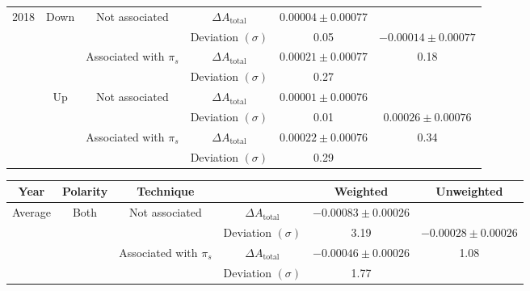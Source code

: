 \documentclass{article}
\begin{document}
\begin{center}
\begin{tabular}{c|c|c|c|c|c}
                        \multirow{8}{*}{2018} & \multirow{4}{*}{Down} & \multirow{2}{*}{Not associated} & $\Delta A_\text{total}$ & $0.00004\pm 0.00077$& \\
                        & & & Deviation $(\sigma)$ & 0.05& $-0.00014\pm 0.00077$\\
                        \cline{3-5}
                        & & \multirow{2}{*}{Associated with $\pi_s$} & $\Delta A_\text{total}$ & $0.00021\pm 0.00077$& 0.18\\
                        & & & Deviation $(\sigma)$ & 0.27& \\
                        \cline{2-6}
                        & \multirow{4}{*}{Up} & \multirow{2}{*}{Not associated} & $\Delta A_\text{total}$ & $0.00001\pm 0.00076$& \\
                        & & & Deviation $(\sigma)$ & 0.01& $0.00026\pm 0.00076$\\
                        \cline{3-5}
                        & & \multirow{2}{*}{Associated with $\pi_s$} & $\Delta A_\text{total}$ & $0.00022\pm 0.00076$& 0.34\\
                        & & & Deviation $(\sigma)$ & 0.29& \\
                        \hline
                \end{tabular}
                \label{tab:all}
        \end{center}

        \begin{center}
                \begin{tabular}{c|c|c|c|c|c}
                        Year & Polarity & Technique & & Weighted & Unweighted\\
                        \hline\hline
                        \multirow{4}{*}{Average} & \multirow{4}{*}{Both} & \multirow{2}{*}{Not associated} & $\Delta A_\text{total}$ & $-0.00083\pm 0.00026$& \\
                        & & & Deviation $(\sigma)$ & 3.19& $-0.00028\pm 0.00026$\\
                        \cline{3-5}
                        & & \multirow{2}{*}{Associated with $\pi_s$} & $\Delta A_\text{total}$ & $-0.00046\pm 0.00026$& 1.08\\
                        & & & Deviation $(\sigma)$ & 1.77& \\
                \end{tabular}
                \label{tab:average}
        \end{center}
\end{document}
